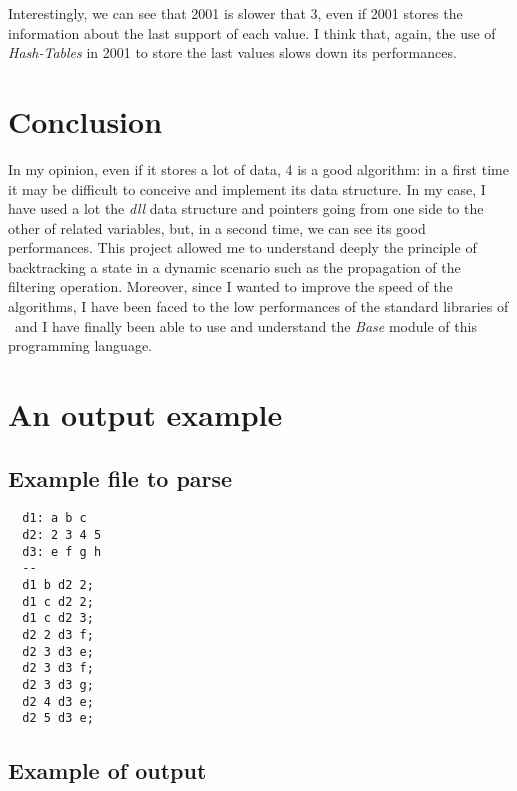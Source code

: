 \documentclass{rapport}
\begin{document}
Interestingly, we can see that \ac{2001} is slower that \ac{3}, even if \ac{2001} stores the information about the last support of each value. I think that, again, the use of \textit{Hash-Tables} in \ac{2001} to store the last values slows down its performances.

\section{Conclusion}

In my opinion, even if it stores a lot of data, \ac{4} is a good algorithm: in a first time it may be difficult to conceive and implement its data structure. In my case, I have used a lot the \textit{dll} data structure and pointers going from one side to the other of related variables, but, in a second time, we can see its good performances. This project allowed me to understand deeply the principle of backtracking a state in a dynamic scenario such as the propagation of the filtering operation. Moreover, since I wanted to improve the speed of the algorithms, I have been faced to the low performances of the standard libraries of \ml\ and I have finally been able to use and understand the \textit{Base} module of this programming language.

\newpage

\appendix

\section{An output example}

\subsection{Example file to parse}
\label{sec:input_ex}
\begin{verbatim}
  d1: a b c 
  d2: 2 3 4 5
  d3: e f g h
  --
  d1 b d2 2;
  d1 c d2 2;
  d1 c d2 3;
  d2 2 d3 f;
  d2 3 d3 e;
  d2 3 d3 f;
  d2 3 d3 g;
  d2 4 d3 e;
  d2 5 d3 e;
\end{verbatim}


\subsection{Example of output}
\label{sec:output_ex}
\end{document}
